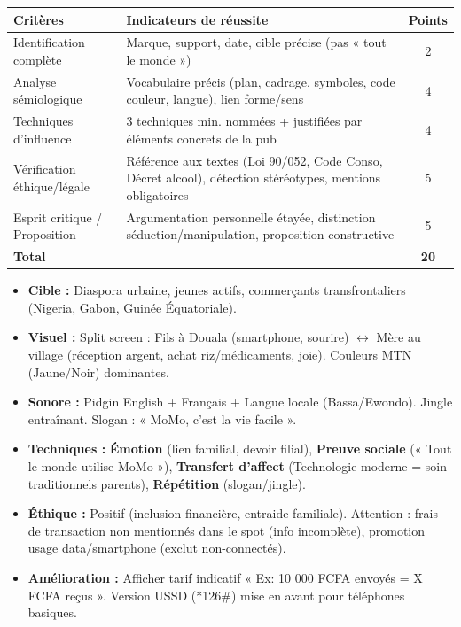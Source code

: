 \documentclass[11pt]{article}
\begin{document}
\begin{corrige}
\begin{center}
\begin{tabularx}{\linewidth}{|l|X|c|}\hline
\rowcolor{popblueL}
\textbf{Critères} & \textbf{Indicateurs de réussite} & \textbf{Points} \\ \hline
Identification complète & Marque, support, date, cible précise (pas « tout le monde ») & 2 \\ \hline
Analyse sémiologique & Vocabulaire précis (plan, cadrage, symboles, code couleur, langue), lien forme/sens & 4 \\ \hline
Techniques d'influence & 3 techniques min. nommées + justifiées par éléments concrets de la pub & 4 \\ \hline
Vérification éthique/légale & Référence aux textes (Loi 90/052, Code Conso, Décret alcool), détection stéréotypes, mentions obligatoires & 5 \\ \hline
Esprit critique / Proposition & Argumentation personnelle étayée, distinction séduction/manipulation, proposition constructive & 5 \\ \hline
\textbf{Total} & & \textbf{20} \\ \hline
\end{tabularx}
\end{center}
\end{corrige}

\begin{exemplebox}
\begin{itemize}
    \item \textbf{Cible :} Diaspora urbaine, jeunes actifs, commerçants transfrontaliers (Nigeria, Gabon, Guinée Équatoriale).
    \item \textbf{Visuel :} Split screen : Fils à Douala (smartphone, sourire) $\leftrightarrow$ Mère au village (réception argent, achat riz/médicaments, joie). Couleurs MTN (Jaune/Noir) dominantes.
    \item \textbf{Sonore :} Pidgin English + Français + Langue locale (Bassa/Ewondo). Jingle entraînant. Slogan : « MoMo, c'est la vie facile ».
    \item \textbf{Techniques :} \textbf{Émotion} (lien familial, devoir filial), \textbf{Preuve sociale} (« Tout le monde utilise MoMo »), \textbf{Transfert d'affect} (Technologie moderne = soin traditionnels parents), \textbf{Répétition} (slogan/jingle).
    \item \textbf{Éthique :} Positif (inclusion financière, entraide familiale). Attention : frais de transaction non mentionnés dans le spot (info incomplète), promotion usage data/smartphone (exclut non-connectés).
    \item \textbf{Amélioration :} Afficher tarif indicatif « Ex: 10 000 FCFA envoyés = X FCFA reçus ». Version USSD (*126\#) mise en avant pour téléphones basiques.
\end{itemize}
\end{exemplebox}
\end{document}
